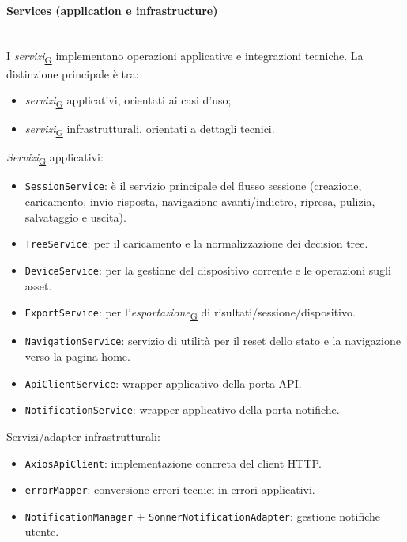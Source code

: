 \documentclass[a4paper,12pt]{article}
\begin{document}
            \paragraph{Services (application e infrastructure)}\mbox{}\\
                I \textit{servizi}\textsubscript{\href{https://atlasteam9.github.io/Atlas/glossario.html\#Servizi}{G}} implementano operazioni applicative e integrazioni tecniche. La distinzione principale è tra:
                \begin{itemize}
                    \item \textit{servizi}\textsubscript{\href{https://atlasteam9.github.io/Atlas/glossario.html\#Servizi}{G}} applicativi, orientati ai casi d'uso;
                    \item \textit{servizi}\textsubscript{\href{https://atlasteam9.github.io/Atlas/glossario.html\#Servizi}{G}} infrastrutturali, orientati a dettagli tecnici.
                \end{itemize}
                \textit{Servizi}\textsubscript{\href{https://atlasteam9.github.io/Atlas/glossario.html\#Servizi}{G}} applicativi:
                \begin{itemize}
                    \item \texttt{SessionService}: è il servizio principale del flusso sessione (creazione, caricamento, invio risposta, navigazione avanti/indietro, ripresa, pulizia, salvataggio e uscita).
                    \item \texttt{TreeService}: per il caricamento e la normalizzazione dei decision tree.
                    \item \texttt{DeviceService}: per la gestione del dispositivo corrente e le operazioni sugli asset.
                    \item \texttt{ExportService}: per l'\textit{esportazione}\textsubscript{\href{https://atlasteam9.github.io/Atlas/glossario.html\#Esportazione}{G}} di risultati/sessione/dispositivo.
                    \item \texttt{NavigationService}: servizio di utilità per il reset dello stato e la navigazione verso la pagina home.
                    \item \texttt{ApiClientService}: wrapper applicativo della porta API.
                    \item \texttt{NotificationService}: wrapper applicativo della porta notifiche.
                \end{itemize}
                Servizi/adapter infrastrutturali:
                \begin{itemize}
                    \item \texttt{AxiosApiClient}: implementazione concreta del client HTTP.
                    \item \texttt{errorMapper}: conversione errori tecnici in errori applicativi.
                    \item \texttt{NotificationManager} + \texttt{SonnerNotificationAdapter}: gestione notifiche utente.
                \end{itemize}
        
\end{document}
